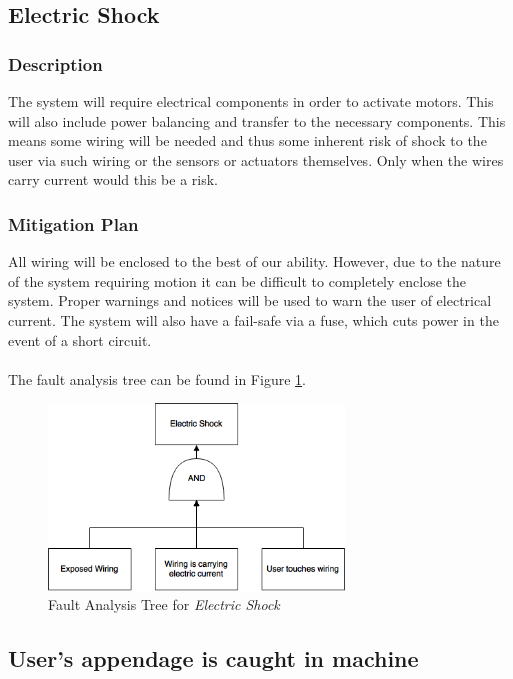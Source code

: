 \documentclass[11pt]{article}
\begin{document}
\subsection{Electric Shock}
\subsubsection*{Description}
The system will require electrical components in order to activate motors. This will also include power balancing and transfer to the necessary components. This means some wiring will be needed and thus some inherent risk of shock to the user via such wiring or the sensors or actuators themselves. Only when the wires carry current would this be a risk.
\subsubsection*{Mitigation Plan}
All wiring will be enclosed to the best of our ability. However, due to the nature of the system requiring motion it can be difficult to completely enclose the system. Proper warnings and notices will be used to warn the user of electrical current. The system will also have a fail-safe via a fuse, which cuts power in the event of a short circuit. \\ \\

The fault analysis tree can be found in Figure \ref{fig:ft-electric}.

\begin{figure}[H]
   \centering
   \includegraphics[width=0.7\textwidth]{img/ft-electric.png} %
   \caption{Fault Analysis Tree for \textit{Electric Shock}}
   \label{fig:ft-electric}
\end{figure}

\subsection{User's appendage is caught in machine}
\end{document}
